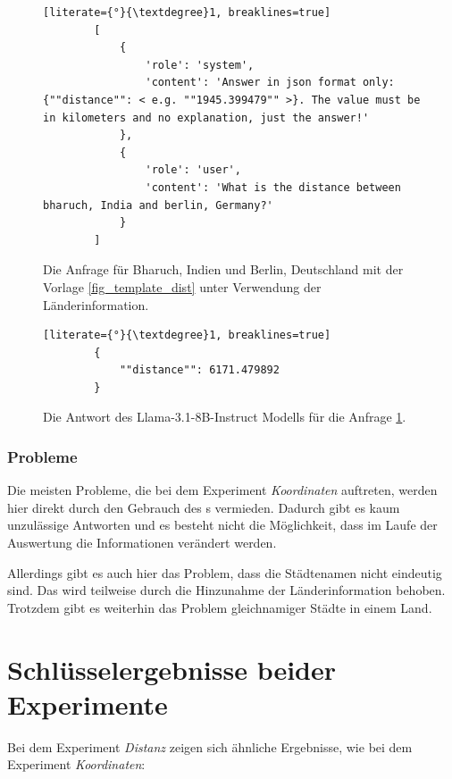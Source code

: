 \begin{figure} %

    \begin{lstlisting}[literate={°}{\textdegree}1, breaklines=true]
        [
            {
                'role': 'system',
                'content': 'Answer in json format only: {""distance"": < e.g. ""1945.399479"" >}. The value must be in kilometers and no explanation, just the answer!'
            },
            {
                'role': 'user',
                'content': 'What is the distance between bharuch, India and berlin, Germany?'
            }
        ]
    \end{lstlisting}

    \caption{Die Anfrage für Bharuch, Indien und Berlin, Deutschland mit der Vorlage \ref{fig_template_dist} unter Verwendung der Länderinformation.}

    \label{dist_message}
\end{figure}

\begin{figure} %

    \begin{lstlisting}[literate={°}{\textdegree}1, breaklines=true]
        {
            ""distance"": 6171.479892
        }
    \end{lstlisting}

    \caption{Die Antwort des Llama-3.1-8B-Instruct Modells für die Anfrage \ref{dist_message}.}

    \label{dist_answer}
\end{figure}

\subsubsection*{Probleme}
Die meisten Probleme, die bei dem Experiment \textit{Koordinaten} auftreten, werden hier direkt durch den Gebrauch des \jsonv{}s vermieden.
Dadurch gibt es kaum unzulässige Antworten und es besteht nicht die Möglichkeit, dass im Laufe der Auswertung die Informationen verändert werden.

Allerdings gibt es auch hier das Problem, dass die Städtenamen nicht eindeutig sind.
Das wird teilweise durch die Hinzunahme der Länderinformation behoben.
Trotzdem gibt es weiterhin das Problem gleichnamiger Städte in einem Land.

\section{Schlüsselergebnisse beider Experimente}
Bei dem Experiment \textit{Distanz} zeigen sich ähnliche Ergebnisse, wie bei dem Experiment \textit{Koordinaten}:


